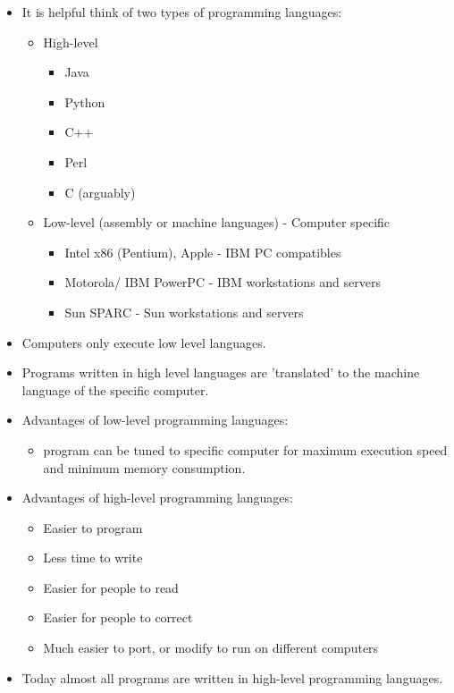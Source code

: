 \documentclass{beamer}
\begin{document}
\begin{frame}
\begin{itemize}
\item It is helpful think of two types of programming languages: 
\begin{itemize}
\item High-level 
\begin{itemize}
\item Java 
\item Python 
\item C++ 
\item Perl 
\item C (arguably)
\end{itemize}
\item Low-level (assembly or machine languages) - Computer specific 
\begin{itemize}
\item Intel x86 (Pentium), Apple - IBM PC compatibles 
\item Motorola/ IBM PowerPC - IBM workstations and servers 
\item Sun SPARC - Sun workstations and servers 
\end{itemize}
\end{itemize}
\item Computers only execute low level languages. 
\item Programs written in high level languages are {}'translated{}' to the machine language of the specific computer. 
\end{itemize}
\end{frame}

\begin{frame}
\begin{itemize}
\item Advantages of low-level programming languages:

\begin{itemize}
\item program can be tuned to specific computer for maximum execution speed and minimum memory consumption. 
\end{itemize}
\item Advantages of high-level programming languages: 

\begin{itemize}
\item Easier to program 
\item Less time to write 
\item Easier for people to read 
\item Easier for people to correct
\item Much easier to port, or modify to run on different computers 
\end{itemize}
\item Today almost all programs are written in high-level programming languages. 
\end{itemize}
\end{frame}
\end{document}
